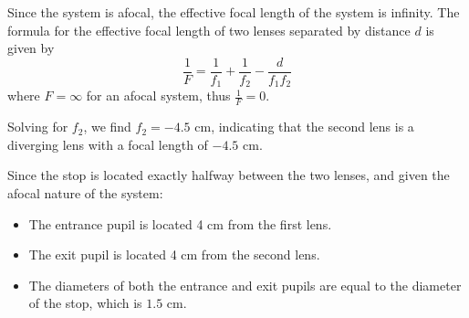 \documentclass{article}
\begin{document}
Since the system is afocal, the effective focal length of the system is infinity. The formula for the effective focal length of two lenses separated by distance \(d\) is given by
\begin{equation}
\frac{1}{F} = \frac{1}{f_1} + \frac{1}{f_2} - \frac{d}{f_1 f_2}
\end{equation}
where \(F = \infty\) for an afocal system, thus \(\frac{1}{F} = 0\).

Solving for \(f_2\), we find \(f_2 = -4.5\) cm, indicating that the second lens is a diverging lens with a focal length of \(-4.5\) cm.

Since the stop is located exactly halfway between the two lenses, and given the afocal nature of the system:
\begin{itemize}
    \item The entrance pupil is located 4 cm from the first lens.
    \item The exit pupil is located 4 cm from the second lens.
    \item The diameters of both the entrance and exit pupils are equal to the diameter of the stop, which is \(1.5\) cm.
\end{itemize}
\end{document}
